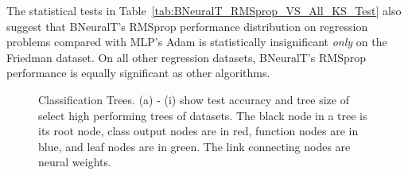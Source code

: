 \documentclass[11pt,a4paper]{article}
\begin{document}
    The statistical tests in  Table~\ref{tab:BNeuralT_RMSprop_VS_All_KS_Test} also suggest that BNeuralT's RMSprop performance distribution on regression problems compared with MLP's Adam is statistically insignificant \textit{only} on the Friedman dataset. On all other regression datasets, BNeuralT's RMSprop performance is equally significant as other algorithms. 
\begin{figure}
        \centering
        
        
        \caption{Classification Trees. (a) - (i) show test accuracy and tree size of select high performing trees of datasets. The black node in a tree is its root node, class output nodes are in red, function nodes are in blue,  and leaf nodes are in green. The link connecting nodes are neural weights.
            \label{fig:tree_image_class}}
    \end{figure} 
    
    
    
\end{document}

